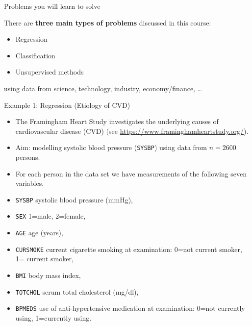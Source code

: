 \documentclass[10pt,ignorenonframetext,]{beamer}
\providecommand{\tightlist}{%
  \setlength{\itemsep}{0pt}\setlength{\parskip}{0pt}}
\begin{document}
\begin{frame}{Problems you will learn to solve}

There are \textbf{three main types of problems} discussed in this
course:

\begin{itemize}
\item
  Regression
\item
  Classification
\item
  Unsupervised methods
\end{itemize}

using data from science, technology, industry, economy/finance, \ldots{}

\end{frame}

\begin{frame}[fragile]{Example 1: Regression (Etiology of CVD)}

\begin{itemize}
\item
  The Framingham Heart Study investigates the underlying causes of
  cardiovascular disease (CVD) (see
  \url{https://www.framinghamheartstudy.org/}). 
\item
  Aim: modelling systolic blood pressure (\texttt{SYSBP}) using data
  from \(n=2600\) persons.
\item
  For each person in the data set we have measurements of the following
  seven variables.
\end{itemize}

\scriptsize

\begin{itemize}
\tightlist
\item
  \texttt{SYSBP} systolic blood pressure (mmHg),
\item
  \texttt{SEX} 1=male, 2=female,
\item
  \texttt{AGE} age (years),
\item
  \texttt{CURSMOKE} current cigarette smoking at examination: 0=not
  current smoker, 1= current smoker,
\item
  \texttt{BMI} body mass index,
\item
  \texttt{TOTCHOL} serum total cholesterol (mg/dl),
\item
  \texttt{BPMEDS} use of anti-hypertensive medication at examination:
  0=not currently using, 1=currently using. \normalsize
\end{itemize}

\end{frame}
\end{document}
